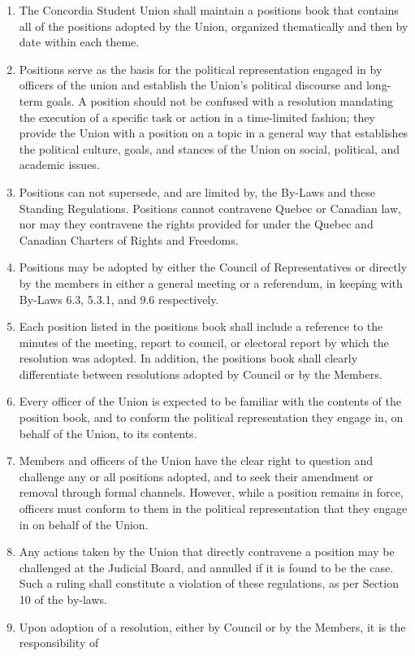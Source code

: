 \documentclass[oneside]{book}
\begin{document}
\begin{enumerate}
\item The Concordia Student Union shall maintain a positions book that contains 
all of the positions adopted by the Union, organized thematically and then by date within each theme.
\item Positions serve as the basis for the political representation engaged in by officers 
of the union and establish the Union’s political discourse and long-term goals. 
A position should not be confused with a resolution mandating the execution of a 
specific task or action in a time-limited fashion; they provide the Union with a 
position on a topic in a general way that establishes the political culture, goals, 
and stances of the Union on social, political, and academic issues.
\item Positions can not supersede, and are limited by, the By-Laws and these Standing Regulations. 
Positions cannot contravene Quebec or Canadian law, nor may they contravene the rights provided 
for under the Quebec and Canadian Charters of Rights and Freedoms.
\item Positions may be adopted by either the Council of Representatives or directly by the members 
in either a general meeting or a referendum, in keeping with By-Laws 6.3, 5.3.1, and 9.6 respectively.
\item Each position listed in the positions book shall include a reference to the minutes of the meeting, 
report to council, or electoral report by which the resolution was adopted. In addition, the positions 
book shall clearly differentiate between resolutions adopted by Council or by the Members.
\item Every officer of the Union is expected to be familiar with the contents of the position book, 
and to conform the political representation they engage in, on behalf of the Union, to its contents.
\item Members and officers of the Union have the clear right to question and challenge any or all 
positions adopted, and to seek their amendment or removal through formal channels. However, while a 
position remains in force, officers must conform to them in the political representation that they 
engage in on behalf of the Union.
\item Any actions taken by the Union that directly contravene a position may be challenged at the 
Judicial Board, and annulled if it is found to be the case. Such a ruling shall constitute a violation 
of these regulations, as per Section 10 of the by-laws.
\item Upon adoption of a resolution, either by Council or by the Members, it is the responsibility of 

\end{enumerate}
\end{document}
